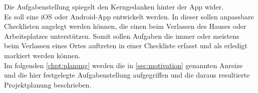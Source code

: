 Die Aufgabenstellung spiegelt den Kerngedanken hinter der App wider.\\
Es soll eine iOS oder Android-App entwickelt werden.
In dieser sollen anpassbare Checklisten angelegt werden können, die einen beim Verlassen des Hauses oder Arbeitsplatzes unterstützen. Somit sollen Aufgaben die immer oder meistens beim Verlassen eines Ortes auftreten in einer Checkliste erfasst und als erledigt markiert werden können.\\
Im folgenden \autoref{chpt:planung}  werden die in \autoref{sec:motivation}  genannten Anreize und die hier festgelegte Aufgabenstellung aufgegriffen und die daraus resultierte Projektplanung beschrieben.